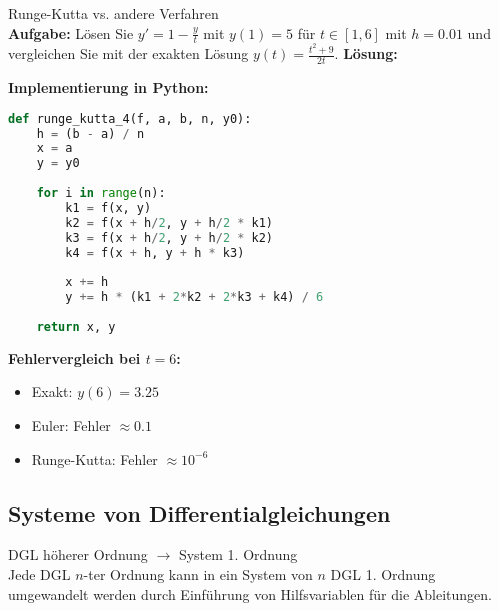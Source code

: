 \begin{example2}{Runge-Kutta vs. andere Verfahren}\\
\textbf{Aufgabe:} Lösen Sie $y' = 1 - \frac{y}{t}$ mit $y(1) = 5$ für $t \in [1,6]$ mit $h = 0.01$ und vergleichen Sie mit der exakten Lösung $y(t) = \frac{t^2 + 9}{2t}$.
\tcblower
\textbf{Lösung:}

\textbf{Implementierung in Python:}
\begin{lstlisting}[language=Python, style=basesmol]
def runge_kutta_4(f, a, b, n, y0):
    h = (b - a) / n
    x = a
    y = y0
    
    for i in range(n):
        k1 = f(x, y)
        k2 = f(x + h/2, y + h/2 * k1)
        k3 = f(x + h/2, y + h/2 * k2)
        k4 = f(x + h, y + h * k3)
        
        x += h
        y += h * (k1 + 2*k2 + 2*k3 + k4) / 6
        
    return x, y
\end{lstlisting}

\textbf{Fehlervergleich bei $t = 6$:}
\begin{itemize}
    \item Exakt: $y(6) = 3.25$
    \item Euler: Fehler $\approx 0.1$
    \item Runge-Kutta: Fehler $\approx 10^{-6}$
\end{itemize}
\end{example2}

\subsection{Systeme von Differentialgleichungen}

\begin{concept}{DGL höherer Ordnung $\rightarrow$ System 1. Ordnung}\\
Jede DGL $n$-ter Ordnung kann in ein System von $n$ DGL 1. Ordnung umgewandelt werden durch Einführung von Hilfsvariablen für die Ableitungen.
\end{concept}

